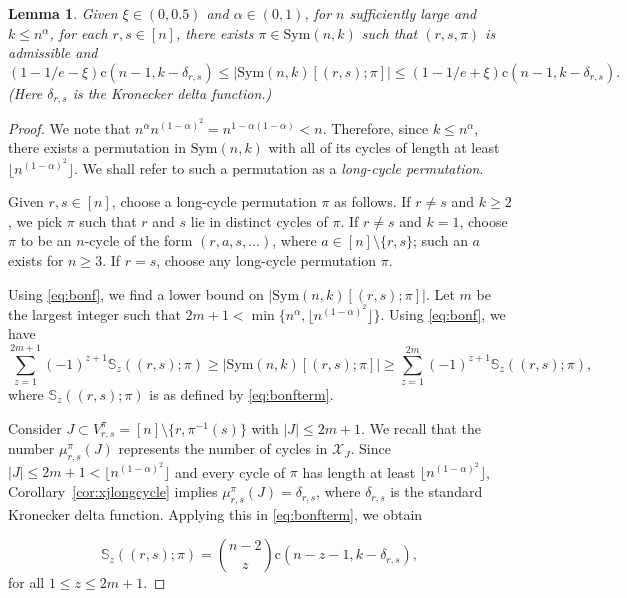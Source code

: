 \documentclass{amsart}
\newtheorem{lem}[thm]{Lemma}
\newcommand{\bb}{\mathbb}
\newcommand{\mcal}{\mathcal}
\newcommand{\sym}{\mathrm{Sym}}
\newcommand{\st}{\mathrm{c}}
\begin{document}
\begin{lem}\label{lem:HMlowerbound}
Given $\xi\in (0,0.5)$ and $\alpha \in (0,1)$, for $n$ sufficiently large and $k\leq n^{\alpha}$, for each  $r,s\in [n]$, there exists $\pi \in \sym(n,k)$ such that $(r,s,\pi)$ is admissible and 
\[(1-1/e -\xi)\st(n-1,k-\delta_{r,s}) \leq |\sym(n,k)[(r,s);\pi]| \leq (1-1/e +\xi)\st(n-1,k-\delta_{r,s}).\] (Here $\delta_{r,s}$ is the Kronecker delta function.)
\end{lem}
\begin{proof}
We note that $n^{\alpha} n^{(1-\alpha)^{2}}=n ^{1-\alpha(1-\alpha)}<n$.
Therefore, since $k\leq n^{\alpha}$, there exists a permutation in $\sym(n,k)$ with all of its cycles of length at least $\lfloor n^{(1-\alpha)^{2}} \rfloor$. We shall refer to such a permutation as a {\it long-cycle permutation}.

Given $r,s\in[n]$, choose a long-cycle permutation $\pi$ as follows. If $r\neq s$ and $k\geq 2$, we pick $\pi$ such that $r$ and $s$ lie in distinct cycles of $\pi$. If $r\neq s$ and $k=1$, choose $\pi$ to be an $n$-cycle of the form $(r,a,s,\ldots)$, where $a\in[n]\setminus \{r,s\}$; such an $a$ exists for $n\geq3$. If $r=s$, choose any long-cycle permutation $\pi$.

Using \eqref{eq:bonf}, we find a lower bound on $|\sym(n,k)[(r,s);\pi]|$. 
Let $m$ be the largest integer such that $2m+1 < \min\{n^{\alpha}, \lfloor n^{(1-\alpha)^{2}}\rfloor \}$. Using \eqref{eq:bonf}, we have 
\begin{equation}\label{eq:bonfineq}
\sum\limits_{z=1}^{2m+1} (-1)^{z+1}\bb{S}_{z}((r,s);\pi)\geq |\sym(n,k)[(r,s);\pi]| \geq \sum\limits_{z=1}^{2m} (-1)^{z+1}\bb{S}_{z}((r,s);\pi),
\end{equation}
 where $\bb{S}_{z}((r,s);\pi)$ is as defined by \eqref{eq:bonfterm}. 

Consider $J \subset V_{r,s}^{\pi}=[n]\setminus \{r,\pi^{-1}(s)\}$ with $|J|\leq 2m+1$. 
We recall that the number $\mu_{r,s}^{\pi}(J)$ represents the number of cycles in $\mcal{X}_{J}$. Since $|J|\leq 2m+1 <\lfloor n^{(1-\alpha)^{2}}\rfloor$ and every cycle of $\pi$ has length at least $\lfloor n^{(1-\alpha)^{2}}\rfloor$, Corollary~\ref{cor:xjlongcycle} implies $\mu_{r,s}^{\pi}(J)=\delta_{r,s}$, where $\delta_{r,s}$ is the standard Kronecker delta function. Applying this in \eqref{eq:bonfterm}, we obtain

\begin{equation}\label{eq:bonftermlongpermint}
\bb{S}_{z}((r,s);\pi) = \binom{n-2}{z} \st(n-z-1,k-\delta_{r,s}),
\end{equation}
for all $1\leq z\leq 2m+1$.


\end{proof}
\end{document}
